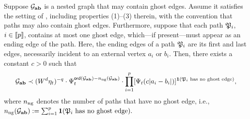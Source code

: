 


\begin{lemma}\label{lem:Anp_key_gh}  
Suppose $\mathcal G_{{\mathbf{a}}{\mathbf{b}}}$ is a nested graph that may contain ghost edges. Assume it satisfies the setting of , including properties (1)--(3) therein, with the convention that paths may also contain ghost edges. Furthermore, suppose that each path $\mathfrak{P}_i$, $i\in\llbracket{p}\rrbracket$, contains at most one ghost edge, which---if present---must appear as an ending edge of the path. Here, the ending edges of a path $\mathfrak{P}_i$ are its first and last edges, necessarily incident to an external vertex $a_i$ or $b_i$. Then, there exists a constant $c>0$ such that
\begin{equation}\label{adsuu22}
\mathcal G_{{\mathbf{a}}{\mathbf{b}}} \prec (W^d\eta_t)^{-q}\cdot \Psi_t^{{\mathsf{ord}}(\mathcal G_{{\mathbf{a}}{\mathbf{b}}})-n_{\mathrm{ng}}(\mathcal G_{{\mathbf{a}}{\mathbf{b}}})}\cdot \prod_{i=1}^p  [\Psi_t(c|a_i-b_i|)]^{\mathbf 1(\mathfrak{P}_i \text{ has no ghost edge})} ,
\end{equation}
where $n_{\mathrm{ng}}$ denotes the number of paths that have no ghost edge, i.e., 
\(n_{\mathrm{ng}}(\mathcal G_{{\mathbf{a}}{\mathbf{b}}}):=\sum_{i=1}^p \mathbf 1(\mathfrak{P}_i \text{ has no ghost edge}) .\)


\end{lemma}
